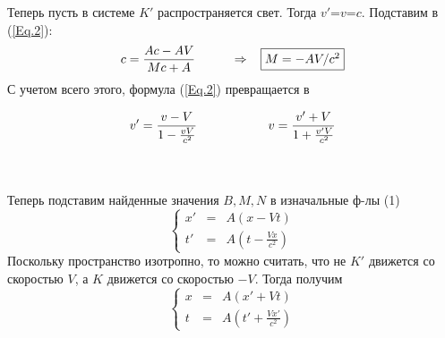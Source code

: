 \documentclass[12pt,epsfig,color,russian]{article}
\begin{document}
Теперь пусть в системе $K'$ распространяется свет. Тогда $v'$=$v$=$c$. Под\-ста\-вим в (\ref{Eq.2}):\vspace{-4mm}
\begin{equation}
c=\frac{Ac-AV}{Mc+A}\hspace{10mm}\Rightarrow\;\;\;\fbox{$M=-AV/c^2$}
\end{equation}
С учетом всего этого, формула (\ref{Eq.2}) превращается в\\[3mm]
{\color{blue} \parbox{180mm}{
\centerline{}
\begin{displaymath}
v'=\frac{v-V}{1-\frac{vV}{c^2}}\hspace{20mm}v=\frac{v'+V}{1+\frac{v'V}{c^2}}
\end{displaymath}
}}\\
\\[5mm]
\noindent
Теперь подставим найденные значения $B,M,N$ в изначальные ф-лы (1)
\vspace{-2mm}
\begin{displaymath}
\left\{ \begin{array}{ccc}
        x'&=&A(x-Vt)\\
        t'&=&A\left(t-\frac{Vx}{c^2}\right)
        \end{array}\right.
\end{displaymath}
Поскольку пространство изотропно, то можно считать, что не $K'$ движется со скоростью $V$, а $K$ движется со скоростью $-V$. Тогда получим
\vspace{-2mm}
\begin{displaymath}
\left\{ \begin{array}{ccc}
        x&=&A(x'+Vt)\\
        t&=&A\left(t'+\frac{Vx'}{c^2}\right)
        \end{array}\right.
\end{displaymath}
\vspace{-2mm}
\end{document}
